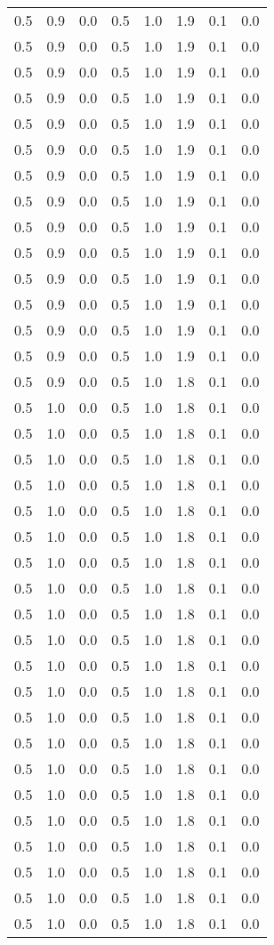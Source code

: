 \begin{tabular}{L{1in}|L{1in}|L{1in}|L{1in}|L{1in}|L{1in}|L{1in}|L{1in}}
0.5&0.9&0.0&0.5&1.0&1.9&0.1&0.0\\
0.5&0.9&0.0&0.5&1.0&1.9&0.1&0.0\\
0.5&0.9&0.0&0.5&1.0&1.9&0.1&0.0\\
0.5&0.9&0.0&0.5&1.0&1.9&0.1&0.0\\
0.5&0.9&0.0&0.5&1.0&1.9&0.1&0.0\\
0.5&0.9&0.0&0.5&1.0&1.9&0.1&0.0\\
0.5&0.9&0.0&0.5&1.0&1.9&0.1&0.0\\
0.5&0.9&0.0&0.5&1.0&1.9&0.1&0.0\\
0.5&0.9&0.0&0.5&1.0&1.9&0.1&0.0\\
0.5&0.9&0.0&0.5&1.0&1.9&0.1&0.0\\
0.5&0.9&0.0&0.5&1.0&1.9&0.1&0.0\\
0.5&0.9&0.0&0.5&1.0&1.9&0.1&0.0\\
0.5&0.9&0.0&0.5&1.0&1.9&0.1&0.0\\
0.5&0.9&0.0&0.5&1.0&1.9&0.1&0.0\\
0.5&0.9&0.0&0.5&1.0&1.8&0.1&0.0\\
0.5&1.0&0.0&0.5&1.0&1.8&0.1&0.0\\
0.5&1.0&0.0&0.5&1.0&1.8&0.1&0.0\\
0.5&1.0&0.0&0.5&1.0&1.8&0.1&0.0\\
0.5&1.0&0.0&0.5&1.0&1.8&0.1&0.0\\
0.5&1.0&0.0&0.5&1.0&1.8&0.1&0.0\\
0.5&1.0&0.0&0.5&1.0&1.8&0.1&0.0\\
0.5&1.0&0.0&0.5&1.0&1.8&0.1&0.0\\
0.5&1.0&0.0&0.5&1.0&1.8&0.1&0.0\\
0.5&1.0&0.0&0.5&1.0&1.8&0.1&0.0\\
0.5&1.0&0.0&0.5&1.0&1.8&0.1&0.0\\
0.5&1.0&0.0&0.5&1.0&1.8&0.1&0.0\\
0.5&1.0&0.0&0.5&1.0&1.8&0.1&0.0\\
0.5&1.0&0.0&0.5&1.0&1.8&0.1&0.0\\
0.5&1.0&0.0&0.5&1.0&1.8&0.1&0.0\\
0.5&1.0&0.0&0.5&1.0&1.8&0.1&0.0\\
0.5&1.0&0.0&0.5&1.0&1.8&0.1&0.0\\
0.5&1.0&0.0&0.5&1.0&1.8&0.1&0.0\\
0.5&1.0&0.0&0.5&1.0&1.8&0.1&0.0\\
0.5&1.0&0.0&0.5&1.0&1.8&0.1&0.0\\
0.5&1.0&0.0&0.5&1.0&1.8&0.1&0.0\\
0.5&1.0&0.0&0.5&1.0&1.8&0.1&0.0\\

\end{tabular}
